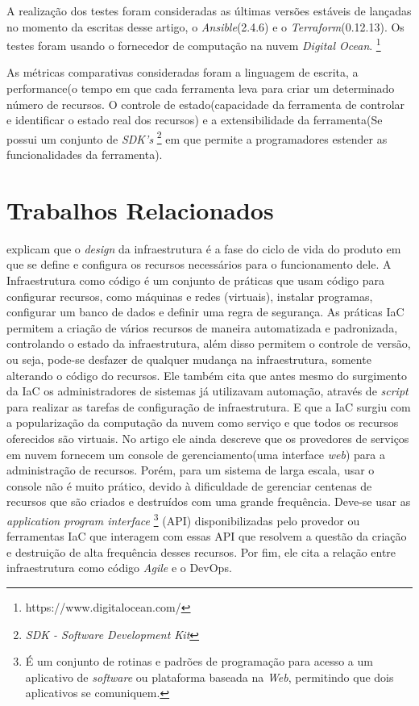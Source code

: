 A realização dos testes foram consideradas as últimas versões estáveis de lançadas no momento da escritas desse artigo, o \textit{Ansible}(2.4.6) e o \textit{Terraform}(0.12.13). Os testes foram usando o fornecedor de computação na nuvem  \textit{Digital Ocean}. \footnote{https://www.digitalocean.com/}   

As métricas comparativas consideradas foram a linguagem de escrita, a performance(o tempo em que cada ferramenta leva para criar um determinado número de recursos. O controle de estado(capacidade da ferramenta  de controlar e identificar o estado real dos recursos) e a extensibilidade da ferramenta(Se possui um conjunto de \textit{SDK's} \footnote{\textit{SDK - Software Development Kit}} em que permite a programadores estender as funcionalidades da ferramenta).  


\section{\esp Trabalhos Relacionados} \label{relacionados}


 explicam que o \textit{design} da infraestrutura é a fase do ciclo de vida do produto em que se define e configura os recursos necessários para o funcionamento dele. A Infraestrutura como código é um conjunto de práticas que usam código para configurar recursos, como máquinas e redes (virtuais), instalar programas, configurar um banco de dados e definir uma regra de segurança. As práticas IaC permitem a criação de vários recursos de maneira automatizada e padronizada, controlando o estado da infraestrutura, além disso permitem o controle de versão, ou seja, pode-se desfazer de qualquer mudança na infraestrutura, somente alterando o código do recursos. Ele também cita que antes mesmo do surgimento da IaC os administradores de sistemas já utilizavam automação, através de \textit{script} para realizar as tarefas de configuração de infraestrutura. E que a IaC surgiu com a popularização da computação da nuvem como serviço e que todos os recursos oferecidos são virtuais. No artigo ele ainda descreve que os provedores de serviços em nuvem fornecem um console de gerenciamento(uma interface \textit{web}) para a administração de recursos. Porém, para um sistema de larga escala, usar o console não é muito prático, devido à dificuldade de gerenciar centenas de recursos que são criados e destruídos com uma grande frequência. Deve-se usar as \textit{application program interface} \footnote{É um conjunto de rotinas e padrões de programação para acesso a um aplicativo de \textit{software} ou plataforma baseada na \textit{Web}, permitindo que dois aplicativos se comuniquem. } (API) disponibilizadas pelo provedor ou ferramentas IaC que interagem com essas API que resolvem a questão da criação e destruição de alta frequência desses recursos. Por fim, ele cita a relação entre infraestrutura como código \textit{Agile} e o DevOps. 

